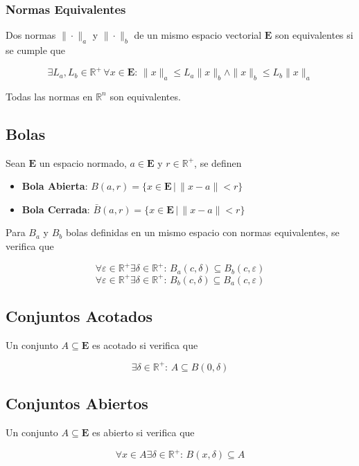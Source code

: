 \subsubsection{Normas Equivalentes}

Dos normas $\|\cdot\|_a$ y $\|\cdot\|_b$ de un mismo espacio vectorial $\mathbf{E}$ son equivalentes si se cumple que

\[\exists L_a, L_b\in\mathbb{R}^+\,\forall x\in\mathbf{E}
:\, \|x\|_a \leq L_a\|x\|_b \wedge \|x\|_b \leq L_b\|x\|_a\]

Todas las normas en $\mathbb{R}^n$ son equivalentes.

\subsection{Bolas}

Sean $\mathbf{E}$ un espacio normado, $a\in\mathbf{E}$ y $r\in\mathbb{R}^+$, se definen

\begin{itemize}
    \item \textbf{Bola Abierta}: $B(a,r)=\{x\in\mathbf{E}\,
    |\,\|x-a\|<r\}$
    \item \textbf{Bola Cerrada}: $\bar{B}(a,r)=\{x\in\mathbf{E}\,|\,\|x-a\|<r\}$
\end{itemize}

Para $B_a$ y $B_b$ bolas definidas en un mismo espacio con normas equivalentes, se verifica que

\[\forall\varepsilon\in\mathbb{R}^+
\exists\delta\in\mathbb{R}^+:\,B_a(c,\delta)\subseteq B_b(c,\varepsilon)\]
\[\forall\varepsilon\in\mathbb{R}^+
\exists\delta\in\mathbb{R}^+:\,B_b(c,\delta)\subseteq B_a(c,\varepsilon)\]

\subsection{Conjuntos Acotados}

Un conjunto $A\subseteq\mathbf{E}$ es acotado si verifica que

\[\exists\delta\in\mathbb{R}^+:\,A\subseteq B(0,\delta)\]

\subsection{Conjuntos Abiertos}

Un conjunto $A\subseteq\mathbf{E}$ es abierto si verifica que

\[\forall x\in A\exists\delta\in\mathbb{R}^+:
\,B(x,\delta)\subseteq A\]

